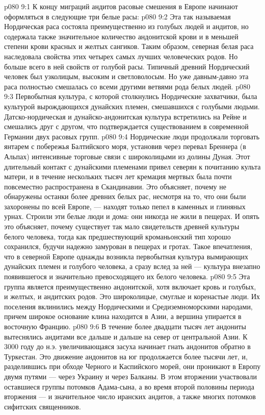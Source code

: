 \vs p080 9:1 К концу миграций андитов расовые смешения в Европе начинают оформляться в следующие три белые расы:
\vs p080 9:2 \bibnobreakspace {} Эта так называемая Нордическая раса состояла преимущественно из голубых людей и андитов, но содержала также значительное количество андонитской крови и в меньшей степени крови красных и желтых сангиков. Таким образом, северная белая раса наследовала свойства этих четырех самых лучших человеческих родов. Но больше всего в ней свойств от голубой расы. Типичный древний Нордический человек был узколицым, высоким и светловолосым. Но уже давным\hyp{}давно эта раса полностью смешалась со всеми другими ветвями рода белых людей.
\vs p080 9:3 Первобытная культура, с которой столкнулись Нордические захватчики, была культурой вырождающихся дунайских племен, смешавшихся с голубыми людьми. Датско\hyp{}нордическая и дунайско\hyp{}андонитская культура встретились на Рейне и смешались друг с другом, что подтверждается существованием в современной Германии двух расовых групп.
\vs p080 9:4 Нордические люди продолжали торговать янтарем с побережья Балтийского моря, установив через перевал Бреннера (в Альпах) интенсивные торговые связи с широколицыми из долины Дуная. Этот длительный контакт с дунайскими племенами привел северян к почитанию культа матери, и в течение нескольких тысяч лет кремация мертвых была почти повсеместно распространена в Скандинавии. Это объясняет, почему не обнаружены останки более древних белых рас, несмотря на то, что они были захоронены по всей Европе, --- находят только пепел в каменных и глиняных урнах. Строили эти белые люди и дома: они никогда не жили в пещерах. И опять это объясняет, почему существует так мало свидетельств древней культуры белого человека, тогда как предшествующий кроманьонский тип хорошо сохранился, будучи надежно замурован в пещерах и гротах. Такое впечатления, что в северной Европе однажды возникла первобытная культура вымирающих дунайских племен и голубого человека, а сразу вслед за ней --- культура внезапно появившегося и значительно превосходящего их белого человека.
\vs p080 9:5 \bibnobreakspace {} Эта группа является преимущественно андонитской, хотя включает кровь и голубых, и желтых, и андитских родов. Это широколицые, смуглые и коренастые люди. Их поселения вклинились между Нордическими и Средиземноморскими народами, причем широкое основание клина находится в Азии, а вершина упирается в восточную Францию.
\vs p080 9:6 В течение более двадцати тысяч лет андониты вытеснялись андитами все дальше и дальше на север от центральной Азии. К 3000 году до н.э. увеличивающаяся засуха начинает гнать андонитов обратно в Туркестан. Это движение андонитов на юг продолжается более тысячи лет, и, разделившись при обходе Черного и Каспийского морей, они проникают в Европу двумя путями --- через Украину и через Балканы. В этом вторжении участвовали оставшиеся группы потомков Адама\hyp{}сына, а во время второй половины периода вторжения --- и значительное число иранских андитов, а также многих потомков сифитских священников.
